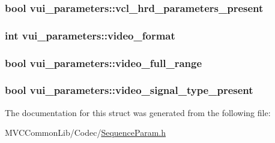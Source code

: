 \label{structvui__parameters_a12fae463652694b20fe5347dd511a7e3}
\hypertarget{structvui__parameters_a4f9c102f40cf3b536c5e3b70ab0e3681}{
\subsubsection[{vcl\_\-hrd\_\-parameters\_\-present}]{\setlength{\rightskip}{0pt plus 5cm}bool {\bf vui\_\-parameters::vcl\_\-hrd\_\-parameters\_\-present}}}
\label{structvui__parameters_a4f9c102f40cf3b536c5e3b70ab0e3681}
\hypertarget{structvui__parameters_aa1737b407d6ae404f5e81038b1ee9d65}{
\subsubsection[{video\_\-format}]{\setlength{\rightskip}{0pt plus 5cm}int {\bf vui\_\-parameters::video\_\-format}}}
\label{structvui__parameters_aa1737b407d6ae404f5e81038b1ee9d65}
\hypertarget{structvui__parameters_aa9ac95d330a9bcd970830db2ac4bb0da}{
\subsubsection[{video\_\-full\_\-range}]{\setlength{\rightskip}{0pt plus 5cm}bool {\bf vui\_\-parameters::video\_\-full\_\-range}}}
\label{structvui__parameters_aa9ac95d330a9bcd970830db2ac4bb0da}
\hypertarget{structvui__parameters_a9684753851e30c951d6383e285706611}{
\subsubsection[{video\_\-signal\_\-type\_\-present}]{\setlength{\rightskip}{0pt plus 5cm}bool {\bf vui\_\-parameters::video\_\-signal\_\-type\_\-present}}}
\label{structvui__parameters_a9684753851e30c951d6383e285706611}


The documentation for this struct was generated from the following file:\begin{DoxyCompactItemize}
\item 
MVCCommonLib/Codec/\hyperlink{_sequence_param_8h}{SequenceParam.h}\end{DoxyCompactItemize}
